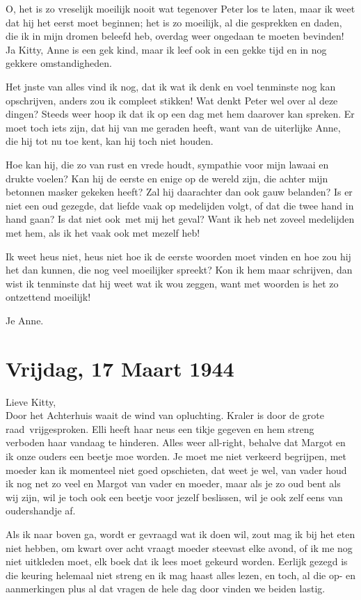 \documentclass{book}
\begin{document}
O, het is zo vreselijk moeilijk nooit wat tegenover Peter los te laten,
maar ik weet dat hij het eerst moet beginnen; het is zo moeilijk, al die
gesprekken en daden, die ik in mijn dromen beleefd heb, overdag weer
ongedaan te moeten bevinden! Ja Kitty, Anne is een gek kind, maar ik
leef ook in een gekke tijd en in nog gekkere omstandigheden.

Het jnste van alles vind ik nog, dat ik wat ik denk en voel tenminste
nog kan opschrijven, anders zou ik compleet stikken! Wat denkt Peter wel
over al deze dingen? Steeds weer hoop ik dat ik op een dag met hem
daarover kan spreken. Er moet toch iets zijn, dat hij van me geraden
heeft, want van de uiterlijke Anne, die hij tot nu toe kent, kan hij
toch niet houden.

Hoe kan hij, die zo van rust en vrede houdt, sympathie voor mijn lawaai
en drukte voelen? Kan hij de eerste en enige op de wereld zijn, die
achter mijn betonnen masker gekeken heeft? Zal hij daarachter dan ook
gauw belanden? Is er niet een oud gezegde, dat liefde vaak op medelijden
volgt, of dat die twee hand in hand gaan? Is dat niet ook~met mij het
geval? Want ik heb net zoveel medelijden met hem, als ik het vaak ook
met mezelf heb!

Ik weet heus niet, heus niet hoe ik de eerste woorden moet vinden en hoe
zou hij het dan kunnen, die nog veel moeilijker spreekt? Kon ik hem maar
schrijven, dan wist ik tenminste dat hij weet wat ik wou zeggen, want
met woorden is het zo ontzettend moeilijk!

Je Anne.

\chapter{Vrijdag, 17 Maart 1944}

Lieve Kitty,\\Door het Achterhuis waait de wind van opluchting. Kraler
is door de grote raad~vrijgesproken. Elli heeft haar neus een tikje
gegeven en hem streng verboden haar vandaag te hinderen. Alles weer
all-right, behalve dat Margot en ik onze ouders een beetje moe worden.
Je moet me niet verkeerd begrijpen, met moeder kan ik momenteel niet
goed opschieten, dat weet je wel, van vader houd ik nog net zo veel en
Margot van vader en moeder, maar als je zo oud bent als wij zijn, wil je
toch ook een beetje voor jezelf beslissen, wil je ook zelf eens van
oudershandje af.

Als ik naar boven ga, wordt er gevraagd wat ik doen wil, zout mag ik bij
het eten niet hebben, om kwart over acht vraagt moeder steevast elke
avond, of ik me nog niet uitkleden moet, elk boek dat ik lees moet
gekeurd worden. Eerlijk gezegd is die keuring helemaal niet streng en ik
mag haast alles lezen, en toch, al die op- en aanmerkingen plus al dat
vragen de hele dag door vinden we beiden lastig.
\end{document}
